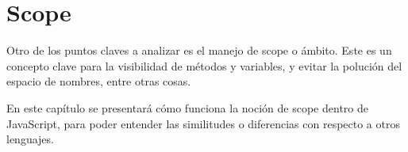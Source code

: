 \chapter{Scope} %

\label{ch:scope} %

Otro de los puntos claves a analizar es el manejo de scope o ámbito. Este es un concepto clave para la visibilidad de métodos y variables, y evitar la polución del espacio de nombres, entre otras cosas.

En este capítulo se presentará cómo funciona la noción de scope dentro de JavaScript, para poder entender las similitudes o diferencias con respecto a otros lenguajes.






